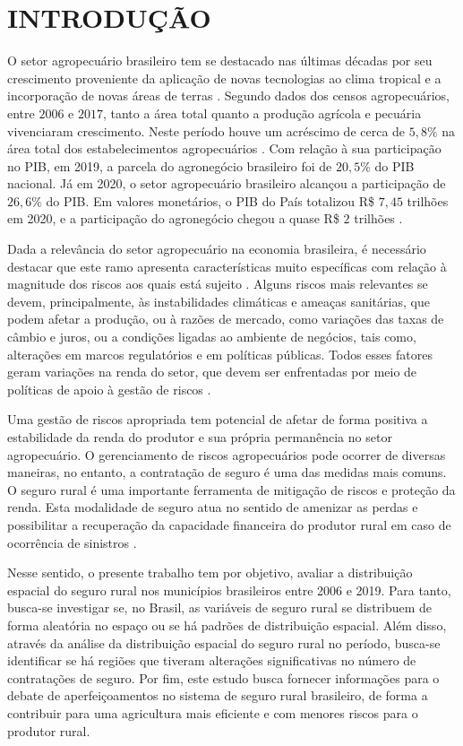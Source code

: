 \section{INTRODUÇÃO}

O setor agropecuário brasileiro tem se destacado nas últimas décadas por seu crescimento proveniente da aplicação de novas tecnologias ao clima tropical e a incorporação de novas áreas de terras \cite{brasil19a}. Segundo dados dos censos agropecuários, entre $2006$ e $2017$, tanto a área total quanto a produção agrícola e pecuária vivenciaram crescimento. Neste período houve um acréscimo de cerca de $5,8\%$ na área total dos estabelecimentos agropecuários \cite{ibge19}. Com relação à sua participação no PIB, em 2019, a parcela do agronegócio brasileiro foi de  $20,5\%$  do PIB nacional. Já em 2020, o setor agropecuário brasileiro alcançou a participação de $26,6\%$ do PIB. Em valores monetários, o PIB do País totalizou R\$ $7,45$ trilhões em 2020, e a participação do agronegócio chegou a quase R\$ $2$ trilhões \cite{cepea21}. 

Dada a relevância do setor agropecuário na economia brasileira, é necessário destacar que este ramo apresenta características muito específicas com relação à magnitude dos riscos aos quais está sujeito \cite{burgo05}. Alguns riscos mais relevantes se devem, principalmente, às instabilidades climáticas e ameaças sanitárias, que podem afetar a produção, ou à razões de mercado, como variações das taxas de câmbio e juros, ou a condições ligadas ao ambiente de negócios, tais como, alterações em marcos regulatórios e em políticas públicas. Todos esses fatores geram variações na renda do setor, que devem ser enfrentadas por meio de políticas de apoio à gestão de riscos \cite{brasil21}. 

Uma gestão de riscos apropriada tem potencial de afetar de forma positiva a estabilidade da renda do produtor e sua própria permanência no setor agropecuário. O gerenciamento de riscos agropecuários pode ocorrer de diversas maneiras, no entanto, a contratação de seguro é uma das medidas mais comuns. O seguro rural é uma importante ferramenta de mitigação de riscos e proteção da renda. Esta modalidade de seguro atua no sentido de amenizar as perdas e possibilitar a recuperação da capacidade financeira do produtor rural em caso de ocorrência de sinistros \cite{brasil19b}. 

Nesse sentido, o presente trabalho tem por objetivo, avaliar a distribuição espacial do seguro rural nos municípios brasileiros entre 2006 e 2019. Para tanto, busca-se investigar se, no Brasil, as variáveis de seguro rural se distribuem de forma aleatória no espaço ou se há padrões de distribuição espacial. Além disso, através da análise da distribuição espacial do seguro rural no período, busca-se identificar se há regiões que tiveram alterações significativas no número de contratações de seguro. Por fim, este estudo busca fornecer informações para o debate de aperfeiçoamentos no sistema de seguro rural brasileiro, de forma a contribuir para uma agricultura mais eficiente e com menores riscos para o produtor rural.

